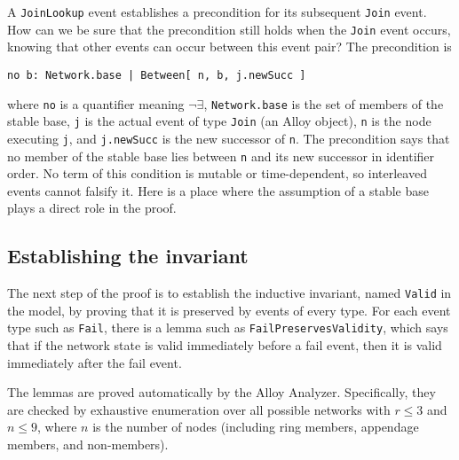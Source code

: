 \documentclass[conference]{IEEEtran}
\begin{document}
A 
\small
{\tt JoinLookup}
\normalsize
event establishes a precondition for its
subsequent
\small
{\tt Join}
\normalsize
event.
How can we be sure that the precondition still holds when the 
\small
{\tt Join}
\normalsize
event occurs, knowing that other events can occur
between this event pair?
The precondition is
\small
\begin{verbatim}
no b: Network.base | Between[ n, b, j.newSucc ]
\end{verbatim}
\normalsize
where
\small
{\tt no}
\normalsize
is a quantifier meaning $\neg \exists$,
\small
{\tt Network.base}
\normalsize
is the set of members of the stable base,
\small
{\tt j}
\normalsize
is the actual event of type
\small
{\tt Join}
\normalsize
(an Alloy object),
\small
{\tt n}
\normalsize
is the node executing
\small
{\tt j},
\normalsize
and
\small
{\tt j.newSucc}
\normalsize
is the new successor of
\small
{\tt n}.
\normalsize
The precondition says that
no member of the stable base lies between
\small
{\tt n}
\normalsize
and its new successor in identifier order.
No term of this condition is mutable or time-dependent, so interleaved
events cannot falsify it.
Here is a place where the assumption of a stable base plays a direct
role in the proof.

\subsection{Establishing the invariant}

The next step of the proof is to establish the inductive invariant,
named 
\small
{\tt Valid}
\normalsize
in the model,
by proving that it is preserved by events of every type.
For each event type such as 
\small
{\tt Fail},
\normalsize
there is a lemma such as
\small
{\tt FailPreservesValidity},
\normalsize
which says that if the network state is valid immediately before a fail
event, then it is valid immediately after the fail event.

The lemmas are proved automatically by the Alloy Analyzer.
Specifically, they are checked by exhaustive enumeration over all
possible networks with
$r \leq 3$ and $n \leq 9$, where $n$ is the number of nodes (including
ring members, appendage members, and non-members).
\end{document}
